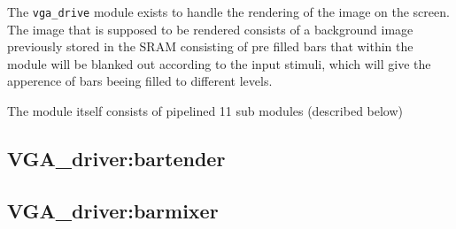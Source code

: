 The \verb+vga_drive+ module exists to handle the rendering of the image on the screen. 
The image that is supposed to be rendered consists of a background image previously 
stored in the SRAM consisting of pre filled bars that within the module will be blanked
out according to the input stimuli, which will give the apperence of bars beeing filled 
to different levels.   

The module itself consists of pipelined 11 sub modules (described below) 

  \subsection{VGA\_driver:bartender}
  \subsection{VGA\_driver:barmixer}

